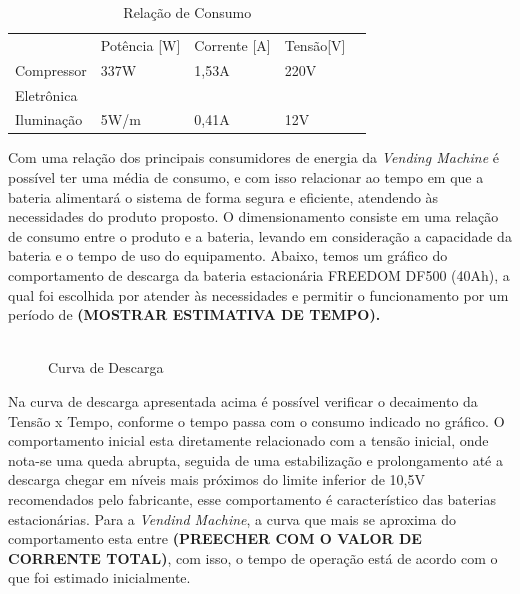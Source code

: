         \begin{table}[]
\centering
\caption{Relação de Consumo}
\label{my-label}
\begin{tabular}{lllll}
           & Potência {[}W{]} & Corrente {[}A{]} & Tensão{[}V{]} &  \\
Compressor & 337W             & 1,53A            & 220V          &  \\
Eletrônica &                  &                  &               &  \\
Iluminação & 5W/m             & 0,41A            & 12V           & 
\end{tabular}
\end{table}
		
        Com uma relação dos principais consumidores de energia da \textit{Vending Machine} é possível ter uma média de consumo, e com isso relacionar ao tempo em que a bateria alimentará o sistema de forma segura e eficiente, atendendo às necessidades do produto proposto. O dimensionamento consiste em uma relação de consumo entre o produto e a bateria, levando em consideração a capacidade da bateria e o tempo de uso do equipamento. 
        Abaixo, temos um gráfico do comportamento de descarga da bateria estacionária FREEDOM DF500 (40Ah), a qual foi escolhida por atender às necessidades e permitir o funcionamento por um período de \textbf{(MOSTRAR ESTIMATIVA DE TEMPO).}

      \begin{figure}[H]
    \centering
    \includegraphics[width=0.7]{figuras/curva_descarga}
    \caption{Curva de Descarga}
    \label{fig:curva_descarga}
\end{figure}

		Na curva de descarga apresentada acima é possível verificar o decaimento da Tensão x Tempo, conforme o tempo passa com o consumo indicado no gráfico. O comportamento inicial esta diretamente relacionado com a tensão inicial, onde nota-se uma queda abrupta, seguida de uma estabilização e prolongamento até a descarga chegar em níveis mais próximos do limite inferior de 10,5V recomendados pelo fabricante, esse comportamento é característico das baterias estacionárias.
        Para a \textit{Vendind Machine}, a curva que mais se aproxima do comportamento esta entre \textbf{(PREECHER COM O VALOR DE CORRENTE TOTAL)}, com isso, o tempo de operação está de acordo com o que foi estimado inicialmente.
        
